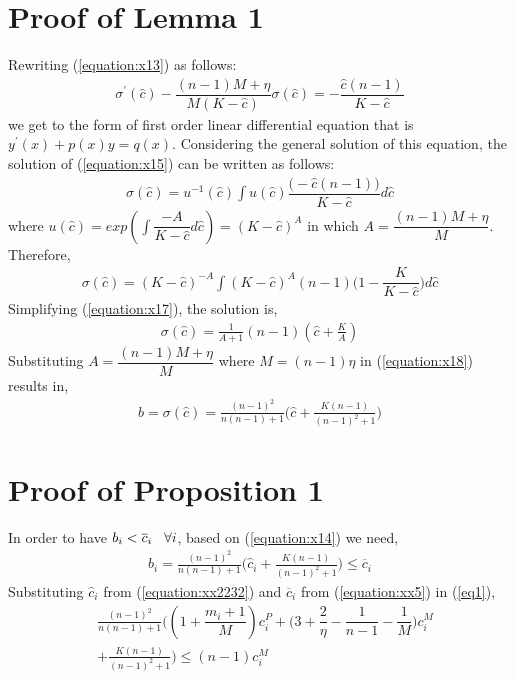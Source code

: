 \documentclass[journal,12pt, onecolumn]{IEEEtran}
\begin{document}
\section{Proof of Lemma 1}
\label{p_l1}
Rewriting (\ref{equation:x13}) as follows:
\begin{equation}
\begin{aligned}
\label{equation:x15}
\sigma^{'}(\widehat{c}) - \dfrac{(n-1)M+\eta}{M(K-\widehat{c})}\sigma(\widehat{c}) = - \dfrac{\widehat{c}(n-1)}{K-\widehat{c}}
\end{aligned}
\end{equation}
we get to the form of first order linear differential equation that is $y^{'} (x) + p(x)y = q(x)$. Considering the general solution of this equation, the solution of (\ref{equation:x15}) can be written as follows:
\begin{align}
\label{equation:x16}
\sigma (\widehat{c}) = u^{-1}(\widehat{c}) \int u(\widehat{c}) \dfrac{\big(-\widehat{c}(n-1)\big)}{K-\widehat{c}} d\widehat{c}
\end{align}
where $u(\widehat{c})= exp(\int \dfrac{-A}{K-\widehat{c}} d\widehat{c})= (K-\widehat{c})^A$ in which $A= \dfrac{(n-1)M+\eta}{M}$. Therefore,
\begin{align}
\label{equation:x17}
\sigma (\widehat{c}) = (K-\widehat{c})^{-A} \int (K-\widehat{c})^{A}(n-1)\big(1- \dfrac{K}{K-\widehat{c}}\big) d\widehat{c}
\end{align}
Simplifying (\ref{equation:x17}), the solution is,
\begin{align}
\label{equation:x18}
\sigma (\widehat{c})= \frac{1}{A+1}(n-1)(\widehat{c} + \frac{K}{A})
\end{align} 
Substituting $A= \dfrac{(n-1)M+\eta}{M}$ where $M=(n-1)\eta$ in (\ref{equation:x18}) results in,
\begin{align}
\label{equation:x140}
b = \sigma (\widehat{c})= \frac{(n-1)^2}{n(n-1)+1}\Big(\widehat{c} + \frac{K(n-1)}{(n-1)^2+1}\Big)
\end{align} 

\section{Proof of Proposition 1}
\label{p_p1}
In order to have $b_i < \overline{c}_i \hspace{3mm} \forall i$, based on (\ref{equation:x14}) we need,
\begin{align}
b_i = \frac{(n-1)^2}{n(n-1)+1}\Big(\widehat{c}_i + \frac{K(n-1)}{(n-1)^2+1}\Big) \leq \overline{c}_i 
\label{eq1} 
\end{align} 
Substituting $\widehat{c}_i$ from (\ref{equation:xx2232}) and $\overline{c}_i$ from (\ref{equation:xx5}) in (\ref{eq1}),
\begin{align}
&\frac{(n-1)^2}{n(n-1)+1}\Big((1 + \dfrac{m_i +1}{M})c_i ^{P} + \big(3+\dfrac{2}{\eta} - \dfrac{1}{n-1} - \dfrac{1}{M}\big)c_i ^{M} 
\nonumber
\\
&+ \frac{K(n-1)}{(n-1)^2+1}\Big) \leq (n-1)c_i ^M 
\label{eq3} 
\end{align}
\end{document}

